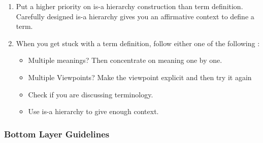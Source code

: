 \begin{enumerate}
\item Put a higher priority on is-a hierarchy construction than term definition. Carefully designed is-a hierarchy gives you an affirmative context to define a term.

\item When you get stuck with a term definition, follow either one of the following : 
\begin{itemize}
\item Multiple meanings? Then concentrate on meaning one by one. 
\item Multiple Viewpoints? Make the viewpoint explicit and then try it again 
\item Check if you are discussing terminology.
\item Use is-a hierarchy to give enough context. 
\end{itemize}
\end{enumerate}

\subsubsection*{Bottom Layer Guidelines}
\label{subsubsec:bottom-layer}

